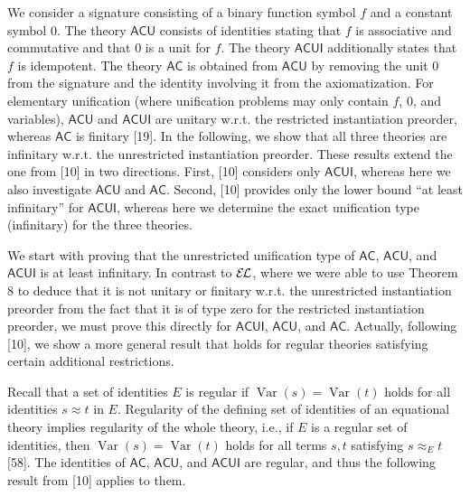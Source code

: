 We consider a signature consisting of a binary function symbol $f$ and a constant symbol $0$. The theory $\mathsf{ACU}$ consists of identities stating that $f$ is associative and commutative and that $0$ is a unit for $f$. The theory $\mathsf{ACUI}$ additionally states that $f$ is idempotent. The theory $\mathsf{AC}$ is obtained from $\mathsf{ACU}$ by removing the unit $0$ from the signature and the identity involving it from the axiomatization. For elementary unification (where unification problems may only contain $f$, $0$, and variables), $\mathsf{ACU}$ and $\mathsf{ACUI}$ are unitary w.r.t. the restricted instantiation preorder, whereas $\mathsf{AC}$ is finitary [19]. In the following, we show that all three theories are infinitary w.r.t. the unrestricted instantiation preorder. These results extend the one from [10] in two directions. First, [10] considers only $\mathsf{ACUI}$, whereas here we also investigate $\mathsf{ACU}$ and $\mathsf{AC}$. Second, [10] provides only the lower bound “at least infinitary” for $\mathsf{ACUI}$, whereas here we determine the exact unification type (infinitary) for the three theories.\par
 
 
 
We start with proving that the unrestricted unification type of $\mathsf{AC}$, $\mathsf{ACU}$, and $\mathsf{ACUI}$ is at least infinitary. In contrast to $\mathcal{E\mkern-1.618muL}$, where we were able to use Theorem 8 to deduce that it is not unitary or finitary w.r.t. the unrestricted instantiation preorder from the fact that it is of type zero for the restricted instantiation preorder, we must prove this directly for $\mathsf{ACUI}$, $\mathsf{ACU}$, and $\mathsf{AC}$. Actually, following [10], we show a more general result that holds for regular theories satisfying certain additional restrictions.\par
 
 
 
Recall that a set of identities $E$ is regular if $\operatorname{Var}(s)=\operatorname{Var}(t)$ holds for all identities $s\approx t$ in $E$. Regularity of the defining set of identities of an equational theory implies regularity of the whole theory, i.e., if $E$ is a regular set of identities, then $\operatorname{Var}(s)=\operatorname{Var}(t)$ holds for all terms $s,t$ satisfying $s\approx_{E}t$ [58]. The identities of $\mathsf{AC}$, $\mathsf{ACU}$, and $\mathsf{ACUI}$ are regular, and thus the following result from [10] applies to them.\par
 
